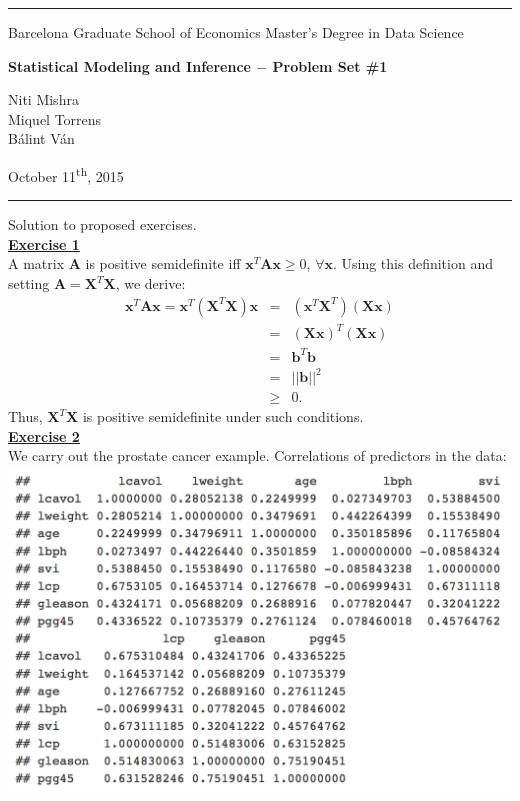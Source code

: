 \documentclass[a4paper, 11pt]{article}
\newcommand{\header}[4]{
	\begin{center}
		\rule{\linewidth}{0.5pt}
		
		{\small{#1}}
      
        \vspace{0.2in}
        
		{\large{#2}}
		
        \vspace{0.2in}
        
		{\small{#3}}
		
		\vspace{0.15in}
		
		{#4}
		
		\vspace{-0.1in}
		\rule{\linewidth}{0.6pt}
	\end{center}
}
\begin{document}
 
\header{\sc Barcelona Graduate School of Economics \hfill Master's Degree in Data Science}{\bf Statistical Modeling and Inference $-$ Problem Set \#1}{\sc Niti Mishra\\Miquel Torrens\\B\'alint V\'an}{October 11\textsuperscript{th}, 2015}
Solution to proposed exercises.\\
\newline \textbf{\underline{Exercise 1}}\\
\newline A matrix $\mathbf{A}$ is positive semidefinite iff $\mathbf{x}^T \mathbf{A} \mathbf{x} \geq 0$, $\forall \mathbf{x}$. Using this definition and setting $\mathbf{A} = \mathbf{X}^T \mathbf{X}$, we derive:
\begin{eqnarray}
\mathbf{x}^T \mathbf{A} \mathbf{x} = \mathbf{x}^T \left( \mathbf{X}^T \mathbf{X} \right) \mathbf{x} &=& \left( \mathbf{x}^T \mathbf{X}^T \right)  \left( \mathbf{X} \mathbf{x}  \right) \nonumber \\
&=& \left( \mathbf{X} \mathbf{x} \right)^T  \left( \mathbf{X} \mathbf{x}  \right) \nonumber \\
&=& \mathbf{b}^T \mathbf{b} \nonumber \\
&=& ||\mathbf{b}||^2 \nonumber \\
&\geq & 0. \nonumber
\end{eqnarray}
Thus, $ \mathbf{X}^T \mathbf{X}$ is positive semidefinite under such conditions.\\
\newline \textbf{\underline{Exercise 2}}\\
\newline We carry out the prostate cancer example. Correlations of predictors in the data:\\
\newline \includegraphics[scale=0.7]{ps1_plot_reg1.png} \\
\end{document}
